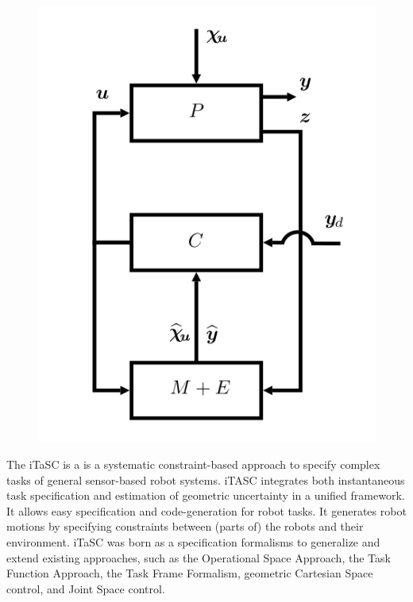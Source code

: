 \begin{figure}[h!]
	\centering
	\includegraphics[scale=0.5]{images/General-control-scheme.png}
\end{figure}
The iTaSC is a is a systematic constraint-based approach to specify complex tasks of general sensor-based robot systems. iTASC integrates both instantaneous task specification and estimation of geometric uncertainty in a unified framework. It allows easy specification and code-generation for robot tasks. It generates robot motions by specifying constraints between (parts of) the robots and their environment. iTaSC was born as a specification formalisms to generalize and extend existing approaches, such as the Operational Space Approach, the Task Function Approach, the Task Frame Formalism, geometric Cartesian Space control, and Joint Space control.

